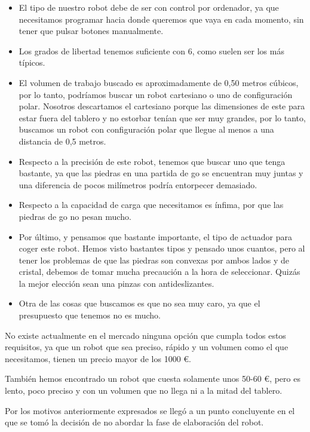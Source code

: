\documentclass[12pt,a4papert,woside,openright,titlepage,final]{book}
\begin{document}
\begin{itemize}
    \item El tipo de nuestro robot debe de ser con control por ordenador, ya
    que necesitamos programar hacia donde queremos que vaya en cada momento, sin
    tener que pulsar botones manualmente. 
    \item Los grados de libertad tenemos suficiente con 6, como suelen ser los
    más típicos. 
    \item El volumen de trabajo buscado es aproximadamente de 0,50 metros
    cúbicos, por lo tanto, podríamos buscar un robot cartesiano o uno de
    configuración polar. Nosotros descartamos el cartesiano porque las
    dimensiones de este para estar fuera del tablero y no estorbar tenían que
    ser muy grandes, por lo tanto, buscamos un robot con configuración polar que
    llegue al menos a una distancia de 0,5 metros. 
    \item Respecto a la precisión de este robot, tenemos que buscar uno que
    tenga bastante, ya que las piedras en una partida de go se encuentran muy
    juntas y una diferencia de pocos milímetros podría entorpecer demasiado. 
    \item Respecto a la capacidad de carga que necesitamos es ínfima, por que
    las piedras de go no pesan mucho. 
    \item Por último, y pensamos que bastante importante, el tipo de actuador para
    coger este robot. Hemos visto bastantes tipos y pensado unos cuantos, pero
    al tener los problemas de que las piedras son convexas por ambos lados y de
    cristal, debemos de tomar mucha precaución a la hora de seleccionar. Quizás
    la mejor elección sean una pinzas con antideslizantes.
    \item Otra de las cosas que buscamos es que no sea muy caro, ya que el
    presupuesto que tenemos no es mucho. 
\end{itemize}


No existe actualmente en el mercado ninguna opción que cumpla todos estos
requisitos, ya que un robot que sea preciso, rápido y un volumen como el que
necesitamos, tienen un precio mayor de los 1000 \euro.

También hemos encontrado un robot que cuesta solamente unos 50-60 \euro, pero es
lento, poco preciso y con un volumen que no llega ni a la mitad del tablero.

Por los motivos anteriormente expresados se llegó a un punto concluyente en el
que se tomó la decisión de no abordar la fase de elaboración del robot.
\end{document}
